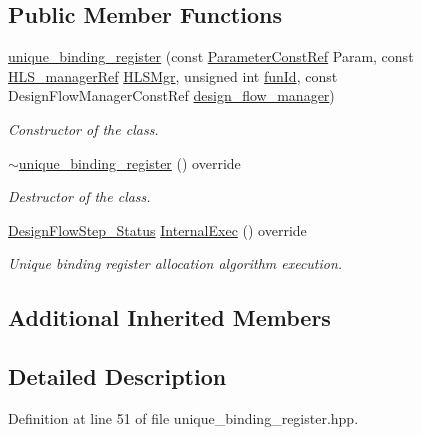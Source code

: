 \subsection*{Public Member Functions}
\begin{DoxyCompactItemize}
\item 
\hyperlink{classunique__binding__register_a2b450419dc8f29e7d75d5898d783d6d5}{unique\+\_\+binding\+\_\+register} (const \hyperlink{Parameter_8hpp_a37841774a6fcb479b597fdf8955eb4ea}{Parameter\+Const\+Ref} Param, const \hyperlink{hls__manager_8hpp_acd3842b8589fe52c08fc0b2fcc813bfe}{H\+L\+S\+\_\+manager\+Ref} \hyperlink{classHLS__step_ade85003a99d34134418451ddc46a18e9}{H\+L\+S\+Mgr}, unsigned int \hyperlink{classHLSFunctionStep_a3e6434fd86c698b0c70520b859bff5b0}{fun\+Id}, const Design\+Flow\+Manager\+Const\+Ref \hyperlink{classDesignFlowStep_ab770677ddf087613add30024e16a5554}{design\+\_\+flow\+\_\+manager})
\begin{DoxyCompactList}\small\item\em Constructor of the class. \end{DoxyCompactList}\item 
\hyperlink{classunique__binding__register_aaa735fd321ea2aa74c198d469b8ad2e0}{$\sim$unique\+\_\+binding\+\_\+register} () override
\begin{DoxyCompactList}\small\item\em Destructor of the class. \end{DoxyCompactList}\item 
\hyperlink{design__flow__step_8hpp_afb1f0d73069c26076b8d31dbc8ebecdf}{Design\+Flow\+Step\+\_\+\+Status} \hyperlink{classunique__binding__register_a2ac66d0bc11cd4e54db2042014b52291}{Internal\+Exec} () override
\begin{DoxyCompactList}\small\item\em Unique binding register allocation algorithm execution. \end{DoxyCompactList}\end{DoxyCompactItemize}
\subsection*{Additional Inherited Members}


\subsection{Detailed Description}


Definition at line 51 of file unique\+\_\+binding\+\_\+register.\+hpp.



